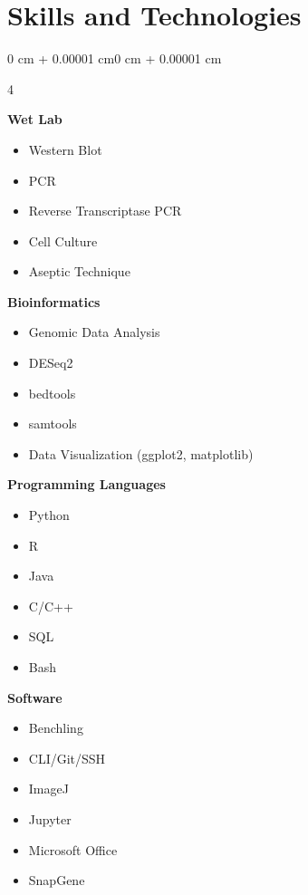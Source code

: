 \documentclass[10pt]{article}
\newenvironment{onecolentry}{
    \begin{adjustwidth}{0 cm + 0.00001 cm}{0 cm + 0.00001 cm}
}{
    \end{adjustwidth}
}
\begin{document}
\section{Skills and Technologies}
\begin{onecolentry}
	\begin{paracol}{4}

		\textbf{Wet Lab}
		\begin{itemize}[topsep=0pt, parsep=0pt, partopsep=0pt, itemsep=0pt, leftmargin=8pt]
			\item Western Blot
			\item PCR
			\item Reverse Transcriptase PCR
			\item Cell Culture
			\item Aseptic Technique
		\end{itemize}

		\switchcolumn

		\textbf{Bioinformatics}
		\begin{itemize}[topsep=0pt, parsep=0pt, partopsep=0pt, itemsep=0pt, leftmargin=8pt]
			\item Genomic Data Analysis
			\item DESeq2
			\item bedtools
			\item samtools
			\item Data Visualization (ggplot2, matplotlib)
		\end{itemize}

		\switchcolumn

		\textbf{Programming Languages}
		\begin{itemize}[topsep=0pt, parsep=0pt, partopsep=0pt, itemsep=0pt, leftmargin=8pt]
			\item Python
			\item R
			\item Java
			\item C/C++
			\item SQL
			\item Bash
		\end{itemize}

		\switchcolumn

		\textbf{Software}
		\begin{itemize}[topsep=0pt, parsep=0pt, partopsep=0pt, itemsep=0pt, leftmargin=8pt]
			\item Benchling
			\item CLI/Git/SSH
			\item ImageJ
			\item Jupyter
			\item Microsoft Office
			\item SnapGene
		\end{itemize}

	\end{paracol}
\end{onecolentry}
\end{document}
